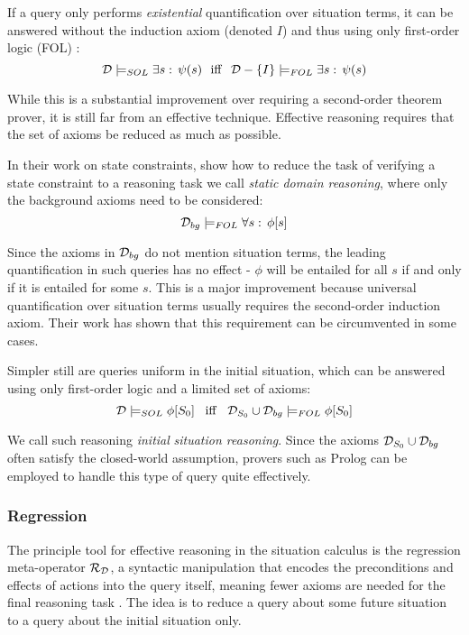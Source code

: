 If a query only performs \emph{existential} quantification over situation
terms, it can be answered without the induction axiom (denoted $I$)
and thus using only first-order logic (FOL) \citep{pirri99contributions_sitcalc}:\[
\mathcal{D}\models_{SOL}\exists s:\,\psi(s)\,\,\,\,\mathrm{iff}\,\,\,\,\mathcal{D}-\{I\}\models_{FOL}\exists s:\,\psi(s)\]


While this is a substantial improvement over requiring a second-order
theorem prover, it is still far from an effective technique. Effective
reasoning requires that the set of axioms be reduced as much as possible.

In their work on state constraints, \citet{Lin94-StateConstraints}
show how to reduce the task of verifying a state constraint to a reasoning
task we call \emph{static domain reasoning}, where only the background
axioms need to be considered:\[
\mathcal{D}_{bg}\models_{FOL}\forall s:\,\phi[s]\]


Since the axioms in $\mathcal{D}_{bg}$ do not mention situation terms, the
leading quantification in such queries has no effect - $\phi$ will
be entailed for all $s$ if and only if it is entailed for some $s$.
This is a major improvement because universal quantification over
situation terms usually requires the second-order induction axiom.
Their work has shown that this requirement can be circumvented in
some cases.

Simpler still are queries uniform in the initial situation, which
can be answered using only first-order logic and a limited set of
axioms:\[
\mathcal{D}\models_{SOL}\phi[S_{0}]\,\,\,\,\,\mathit{\mathrm{iff}}\,\,\,\,\,\mathcal{D}_{S_{0}}\cup\mathcal{D}_{bg}\models_{FOL}\phi[S_{0}]\]


We call such reasoning \emph{initial} \emph{situation reasoning}.
Since the axioms $\mathcal{D}_{S_{0}}\cup\mathcal{D}_{bg}$ often satisfy the closed-world
assumption, provers such as Prolog can be employed to handle this
type of query quite effectively.


\subsubsection{Regression}

The principle tool for effective reasoning in the situation calculus
is the regression meta-operator $\mathcal{R}_{\mathcal{D}}$, a syntactic manipulation
that encodes the preconditions and effects of actions into the query
itself, meaning fewer axioms are needed for the final reasoning task
\citep{pirri99contributions_sitcalc}. The idea is to reduce a query
about some future situation to a query about the initial situation
only.

